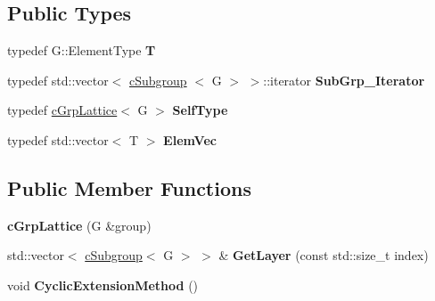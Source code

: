 \subsection*{\-Public \-Types}
\begin{DoxyCompactItemize}
\item 
\hypertarget{classcGrpLattice_adcd74a778419c1f515170d6f4eec0e46}{typedef \-G\-::\-Element\-Type {\bfseries \-T}}\label{classcGrpLattice_adcd74a778419c1f515170d6f4eec0e46}

\item 
\hypertarget{classcGrpLattice_a65bbb53481fb01fab29b56111e08a1a8}{typedef std\-::vector$<$ \hyperlink{classcSubgroup}{c\-Subgroup}\*
$<$ \-G $>$ $>$\-::iterator {\bfseries \-Sub\-Grp\-\_\-\-Iterator}}\label{classcGrpLattice_a65bbb53481fb01fab29b56111e08a1a8}

\item 
\hypertarget{classcGrpLattice_a229b8231e9d4977673fcc629c083ed27}{typedef \hyperlink{classcGrpLattice}{c\-Grp\-Lattice}$<$ \-G $>$ {\bfseries \-Self\-Type}}\label{classcGrpLattice_a229b8231e9d4977673fcc629c083ed27}

\item 
\hypertarget{classcGrpLattice_ae5a1bef06325a01169039dfbbfcd279a}{typedef std\-::vector$<$ \-T $>$ {\bfseries \-Elem\-Vec}}\label{classcGrpLattice_ae5a1bef06325a01169039dfbbfcd279a}

\end{DoxyCompactItemize}
\subsection*{\-Public \-Member \-Functions}
\begin{DoxyCompactItemize}
\item 
\hypertarget{classcGrpLattice_a27f923e1817bed7d7d3b51a02d08bf76}{{\bfseries c\-Grp\-Lattice} (\-G \&group)}\label{classcGrpLattice_a27f923e1817bed7d7d3b51a02d08bf76}

\item 
\hypertarget{classcGrpLattice_a37b06de9e9bf5b647c524f000b054b6a}{std\-::vector$<$ \hyperlink{classcSubgroup}{c\-Subgroup}$<$ \-G $>$ $>$ \& {\bfseries \-Get\-Layer} (const std\-::size\-\_\-t index)}\label{classcGrpLattice_a37b06de9e9bf5b647c524f000b054b6a}

\item 
\hypertarget{classcGrpLattice_af05dbd664f73f60ea2e9bcef893da25b}{void {\bfseries \-Cyclic\-Extension\-Method} ()}\label{classcGrpLattice_af05dbd664f73f60ea2e9bcef893da25b}

\end{DoxyCompactItemize}
